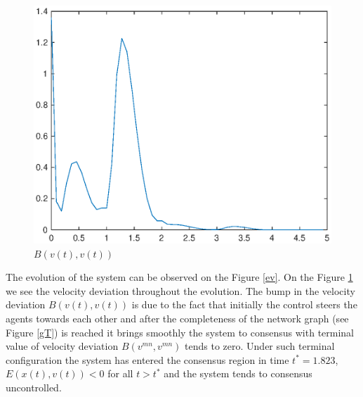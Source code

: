 \documentclass[a4paper,10pt, english]{article}
\begin{document}
 
 \begin{figure}[ht]
 \centering
 \includegraphics[scale=0.5]{figures/a5_D_lf.eps}
 \caption{$B(v(t), v(t))$}
 \label{lf}
 \end{figure}
  \newpage
The evolution of the system can be observed on the Figure \ref{ev}. On the Figure \ref{lf} we see the velocity deviation throughout the evolution. The bump in the velocity deviation $B(v(t), v(t))$
is due to the fact that initially the control steers the agents towards each other and after the completeness of the network graph (see Figure \ref{gT}) is reached it brings smoothly the system to consensus with terminal value of velocity deviation $B(v^{mn}, v^{mn})$ tends to zero. Under such terminal configuration the system has entered the consensus region in time  $t^* = 1.823$,  $E(x(t), v(t)) < 0$ for all $t>t^{*}$ and the system tends to consensus uncontrolled.
\end{document}
